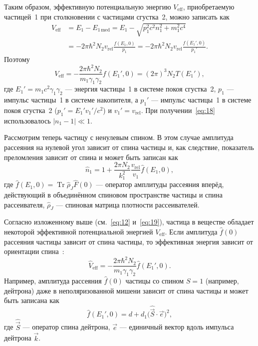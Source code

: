 \documentclass[11pt,a4paper]{article}
\DeclareMathOperator{\Tr}{Tr}
\newcommand{\hvec}[1]{\hat{\vec{#1}}}
\begin{document}
Таким образом, эффективную потенциальную энергию $V_{\mathrm{eff}}$,
приобретаемую частицей~1 при столкновении с частицами сгустка~2,
можно записать как
\begin{equation}
\begin{aligned}
V_{\mathrm{eff}}
&=E_1-E_{1\,\mathrm{med}}
=E_1-\sqrt{p_1^2 c^2 n_1^2+m_1^2 c^4}\\
&=-2\pi\hbar^2 N_2 v_{\mathrm{rel}}\frac{f(E_1,0)}{p_1}
=-2\pi\hbar^2 N_2 v_{\mathrm{rel}}\frac{f(E_1',0)}{p_1'}.
\end{aligned}
\label{eq:18}
\end{equation}
Поэтому
\begin{equation}
V_{\mathrm{eff}}
=-\frac{2\pi\hbar^2 N_2}{m_1\gamma_1\gamma_2}f(E_1',0)
=(2\pi)^3 N_2 T(E_1'),
\label{eq:19}
\end{equation}
где $E_1'=m_1 c^2\gamma_1\gamma_2$ --- энергия частицы~1 в системе покоя
сгустка~2, $p_1$ --- импульс частицы~1 в системе накопителя, а $p_1'$ ---
импульс частицы~1 в системе покоя сгустка~2
($p_1'=E_1' v_1'/c^2$) и $v_1'=v_{\mathrm{rel}}$.
При получении~\eqref{eq:18} использовалось $|n_1-1|\ll 1$.

Рассмотрим теперь частицу с ненулевым спином. В этом случае амплитуда
рассеяния на нулевой угол зависит от спина частицы и, как следствие,
показатель преломления зависит от спина и может быть записан как
\begin{equation}
\hat{n}_1=1+\frac{2\pi N_2}{k_1^2}\frac{v_{\mathrm{rel}}}{v_1}\hat{f}(E_1,0),
\label{eq:20}
\end{equation}
где $\hat{f}(E_1,0)=\Tr\hat{\rho}_J\hat{F}(0)$ --- оператор амплитуды
рассеяния вперёд, действующий в объединённом спиновом пространстве
частицы и спина рассеивателя, $\hat{\rho}_J$ --- спиновая матрица
плотности рассеивателей.

Согласно изложенному выше (см.~\eqref{eq:12} и~\eqref{eq:19}), частица
в веществе обладает некоторой эффективной потенциальной энергией
$V_{\mathrm{eff}}$. Если амплитуда $\hat{f}(0)$ рассеяния частицы зависит
от спина частицы, то эффективная энергия зависит от ориентации
спина~\cite{Bary83a,Bary83b,BaryDub89,BaryShekht96,Bary92,Bary93,Bary98,BarySTORI05}:
\begin{equation}
\hat{V}_{\mathrm{eff}}
=-\frac{2\pi\hbar^2 N_2}{m_1\gamma_1\gamma_2}\hat{f}(E_1',0).
\label{eq:21}
\end{equation}
Например, амплитуда рассеяния $\hat{f}(0)$ частицы со спином $S=1$
(например, дейтрона) даже в неполяризованной мишени зависит от спина
частицы и может быть записана как
\begin{equation}
\hat{f}(E_1',0)=d+d_1\bigl(\hvec{S}\cdot\vec{e}\bigr)^2,
\label{eq:22}
\end{equation}
где $\hvec{S}$ --- оператор спина дейтрона, $\vec{e}$ --- единичный вектор
вдоль импульса дейтрона $\vec{k}$.
\end{document}
